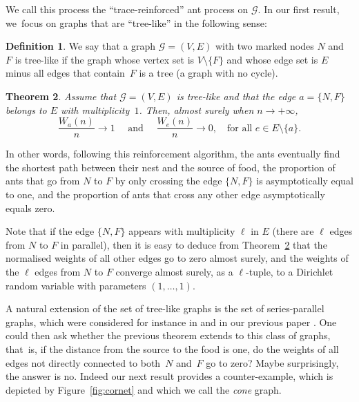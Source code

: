 \documentclass[10pt]{amsart}
\let\mathcal\mathscr
\numberwithin{equation}{section}
\newtheorem{theorem}{Theorem}[section]
\theoremstyle{definition}
\newtheorem{definition}[theorem]{Definition}
\begin{document}
We call this process the ``trace-reinforced'' ant process on $\mathcal G$. In our first result, we~focus on graphs that are ``tree-like'' in the following sense:

\begin{definition}
We say that a graph $\mathcal G = (V,E)$ with two marked nodes $N$ and~$F$
is tree-like if the graph whose vertex set is $V\setminus \{F\}$
and whose edge set is $E$ minus all edges that contain~$F$ is a tree (\ie a graph with no cycle).
\end{definition}


\begin{theorem}\label{th:main}
Assume that $\mathcal G = (V,E)$ is tree-like and that the edge $a=\{N,F\}$ belongs to $E$ with multiplicity~$1$.
Then, almost surely when $n\to+\infty$,
\[
\frac{W_a(n)}{n} \to 1
\quad\text{ and }\quad
\frac{W_e(n)}{n} \to 0,\quad \text{for all } e\in E\setminus\{a\}.
\]
\end{theorem}

In other words, following this reinforcement algorithm, the ants eventually find the shortest path between their nest and the source of food, \ie the proportion of ants that go from $N$ to $F$ by only crossing the edge $\{N,F\}$ is asymptotically equal to one, and the proportion of ants that cross any other edge asymptotically equals zero.

Note that if the edge $\{N,F\}$ appears with multiplicity $\ell$ in $E$ (\ie there are $\ell$ edges from $N$ to $F$ in parallel), then it is easy to deduce from Theorem~\ref{th:main} that the normalised weights of all other edges go to zero almost surely, and the weights of the $\ell$ edges from $N$ to $F$ converge almost surely, as a $\ell$-tuple, to a Dirichlet random variable with parameters $(1, \ldots, 1)$.

A natural extension of the set of tree-like graphs is the set of series-parallel graphs, which were considered for instance in \cite{HJ04} and in our previous paper \cite{KMS}.
One could then ask whether the previous theorem extends to this class of graphs, that~is,
if the distance from the source to the food is one, do the weights of all edges not directly connected to both~$N$ and~$F$ go to zero?
Maybe surprisingly, the answer is no. Indeed our next result provides a counter-example, which is depicted by Figure~\ref{fig:cornet} and which we call the \emph{cone} graph.
\end{document}
